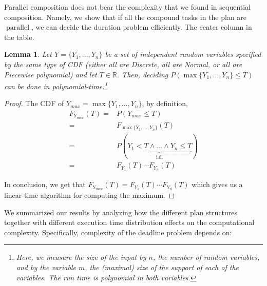 \documentclass{article}
\newtheorem{lemma}{Lemma}
\DeclareMathOperator{\parl}{parallel}
\begin{document}
Parallel composition does not bear the complexity that we found in sequential composition. Namely, we show that if all the compound tasks in the plan are $\parl$, we can decide the duration problem efficiently. The center column in the table.

\begin{lemma} \label{TPar}
	Let $Y=\{Y_1,\dots,Y_n\}$ be a set of independent random variables specified by the same type of %
	CDF (either all are Discrete, all are Normal, or all are Piecewise polynomial) and let $T \in \mathbb{R}$. Then, deciding $P(\max\{Y_1,\dots,Y_n\} \leq T) $ 
	can be done in polynomial-time.\footnote{Here, we measure the size of the input by $n$, the number of random variables, and by the variable $m$, the (maximal) size of the support of each of the variables. The run time is polynomial in both variables.}
\end{lemma}

\begin{proof}
	The CDF of $Y_{max} =\max\{Y_1,\dots,Y_n\} $, by definition, 
	\begin{align*}
	F_{Y_{max}}(T)= &P(Y_{max}\leq T)\\
	= & F_{\max\{Y_1,\dots,Y_n\}}(T)\\
	= & P(\underbrace{Y_1<T \wedge\dots\wedge Y_n\leq T}_\text{i.d.})\\
	= & F_{Y_1}(T)\cdots F_{Y_n}(T)
	\end{align*} 
	
	
	In conclusion, we get that $F_{Y_{max}}(T) = F_{Y_1}(T)\cdots F_{Y_n}(T)$ which gives us a linear-time algorithm for computing the maximum.
\end{proof}

We summarized our results by analyzing how the different plan structures together with different execution time distribution effects on the computational complexity. Specifically, complexity of the deadline problem depends on:
\end{document}
